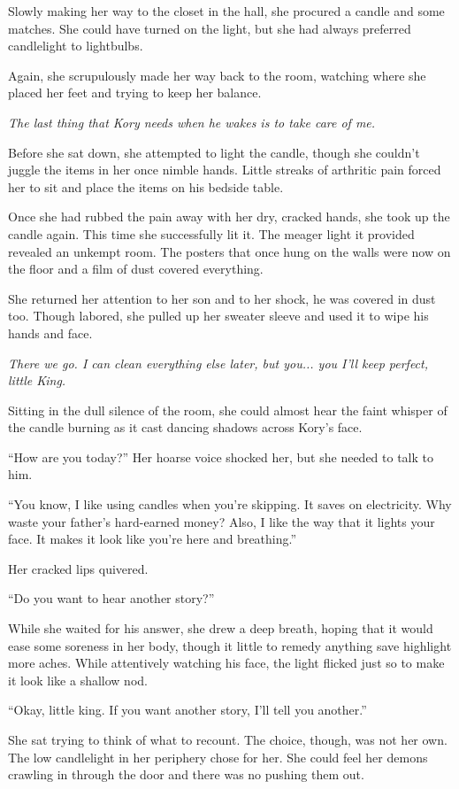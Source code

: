 Slowly making her way to the closet in the hall, she procured a candle and some matches. She could have turned on the light, but she had always preferred candlelight to lightbulbs.

Again, she scrupulously made her way back to the room, watching where she placed her feet and trying to keep her balance.

\textit{The last thing that Kory needs when he wakes is to take care of me.}

Before she sat down, she attempted to light the candle, though she couldn't juggle the items in her once nimble hands. Little streaks of arthritic pain forced her to sit and place the items on his bedside table.

Once she had rubbed the pain away with her dry, cracked hands, she took up the candle again. This time she successfully lit it. The meager light it provided revealed an unkempt room. The posters that once hung on the walls were now on the floor and a film of dust covered everything.

She returned her attention to her son and to her shock, he was covered in dust too. Though labored, she pulled up her sweater sleeve and used it to wipe his hands and face.

\textit{There we go. I can clean everything else later, but you... you I'll keep perfect, little King.}

Sitting in the dull silence of the room, she could almost hear the faint whisper of the candle burning as it cast dancing shadows across Kory's face.

``How are you today?'' Her hoarse voice shocked her, but she needed to talk to him.

``You know, I like using candles when you're skipping. It saves on electricity. Why waste your father's hard-earned money? Also, I like the way that it lights your face. It makes it look like you're here and breathing.''

Her cracked lips quivered.

``Do you want to hear another story?''

While she waited for his answer, she drew a deep breath, hoping that it would ease some soreness in her body, though it little to remedy anything save highlight more aches. While attentively watching his face, the light flicked just so to make it look like a shallow nod.

``Okay, little king. If you want another story, I'll tell you another.''

She sat trying to think of what to recount. The choice, though, was not her own. The low candlelight in her periphery chose for her. She could feel her demons crawling in through the door and there was no pushing them out.

